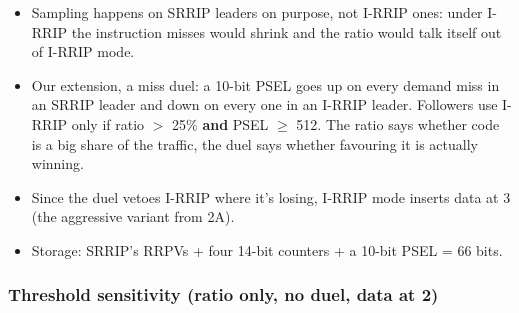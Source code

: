 \documentclass[10pt]{article}
\providecommand{\tightlist}{%
  \setlength{\itemsep}{2pt}\setlength{\parskip}{0pt}}
\begin{document}
\begin{itemize}
\tightlist
\item Sampling happens on SRRIP leaders on purpose, not I-RRIP ones: under I-RRIP the instruction misses would shrink and the ratio would talk itself out of I-RRIP mode.
\item Our extension, a miss duel: a 10-bit PSEL goes up on every demand miss in an SRRIP leader and down on every one in an I-RRIP leader. Followers use I-RRIP only if ratio $>$ 25\% \textbf{and} PSEL $\geq$ 512. The ratio says whether code is a big share of the traffic, the duel says whether favouring it is actually winning.
\item Since the duel vetoes I-RRIP where it's losing, I-RRIP mode inserts data at 3 (the aggressive variant from 2A).
\item Storage: SRRIP's RRPVs + four 14-bit counters + a 10-bit PSEL = 66 bits.
\end{itemize}

\subsubsection{Threshold sensitivity (ratio only, no duel, data at 2)}
\end{document}
